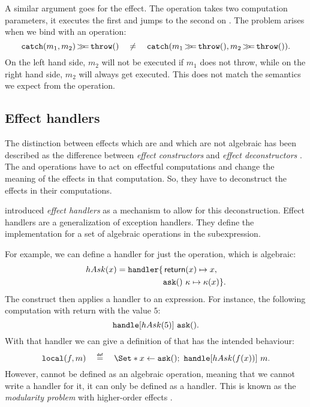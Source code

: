 A similar argument goes for the  effect. The \ocatch operation takes two computation parameters, it executes the first and jumps to the second on \othrow. The problem arises when we bind with an \othrow operation:
\[
    \mathtt{catch}(m_1, m_2) \operatorname{\mathtt{\gg\!\!=}} \mathtt{throw}() \quad\neq\quad \mathtt{catch}(m_1\operatorname{\mathtt{\gg\!\!=}}\mathtt{throw}(), m_2\operatorname{\mathtt{\gg\!\!=}}\mathtt{throw}()).
\]
On the left hand side, $m_2$ will not be executed if $m_1$ does not throw, while on the right hand side, $m_2$ will always get executed. This does not match the semantics we expect from the \ocatch operation.

\subsection{Effect handlers}

The distinction between effects which are and which are not algebraic has been described as the difference between \emph{effect constructors} and \emph{effect deconstructors} \autocite{plotkin_algebraic_2003}. The \olocal and \ocatch operations have to act on effectful computations and change the meaning of the effects in that computation. So, they have to deconstruct the effects in their computations.

\textcite{castagna_handlers_2009} introduced \emph{effect handlers} as a mechanism to allow for this deconstruction. Effect handlers are a generalization of exception handlers. They define the implementation for a set of algebraic operations in the subexpression.

For example, we can define a handler for just the \oask operation, which is algebraic:
\[
    hAsk(x) = \mathbf{\mathtt{handler}} \{
        \begin{aligned}[t]
            &\operatorname{\mathsf{return}}(x) \mapsto x, \\
            &\mathtt{ask}()\ \kappa \mapsto \kappa(x) \}.\\
        \end{aligned}
\]
The \handle construct then applies a handler to an expression. For instance, the following computation with return with the value $5$:
\[
    \mathbf{\mathtt{handle}}[hAsk(5)]\ \mathtt{ask}().
\]
With that handler we can give a definition of \olocal that has the intended behaviour:
\[
    \olocal(f, m) \quad\defeq\quad \S{x \gets \oask()\seq \handle[hAsk(f(x))]\ m}.
\]
However, \olocal cannot be defined as an algebraic operation, meaning that we cannot write a handler for it, it can only be defined as a handler. This is known as the \emph{modularity problem} with higher-order effects \autocite{bach_poulsen_hefty_2023}.


